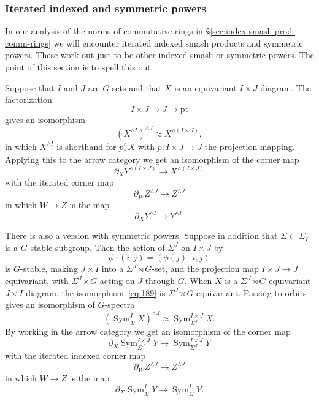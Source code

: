 \documentclass{amsart}
\theoremstyle{definition}
\theoremstyle{remark}
\DeclareMathOperator{\sym}{Sym}
\begin{document}
\subsubsection{Iterated indexed and symmetric powers}
\label{sec:iter-index-symm}

In our analysis of the norms of commutative rings in
\S\ref{sec:index-smash-prod-comm-rings} we will encounter iterated
indexed smash products and symmetric powers.  These work out just to
be other indexed smash or symmetric powers.  The point of this section
is to spell this out.

Suppose that $I$ and $J$ are $G$-sets and that $X$ is an equivariant
$I\times J$-diagram.   The factorization
\[
I\times J\to J\to \text{pt}
\]
gives an isomorphism 
\begin{equation}
\label{eq:189}
(X^{\wedge I})^{\wedge J} \approx X^{\wedge (I\times J)},
\end{equation}
in which $X^{\wedge I}$ is shorthand for $p^{\wedge}_{\ast}X$ with $p:I\times
J\to J$ the projection mapping.   Applying this to the arrow category
we get an isomorphism  of the corner map
\[
\partial_{X}Y^{\wedge (I\times J)} \to X^{\wedge(I\times J)}
\]
with the iterated corner map 
\[
\partial_{W}Z^{\wedge J} \to Z^{\wedge J}
\]
in which $W\to Z$ is the map 
\[
\partial_{X}Y^{\wedge I} \to Y^{\wedge I}.
\]

There is also a version with symmetric powers.  Suppose in addition
that $\Sigma\subset \Sigma_{I}$ is a $G$-stable subgroup.  Then the
action of $\Sigma^{J}$ on $I\times J$ by
\[
\phi\cdot (i,j) = (\phi(j)\cdot i,j)
\]
is $G$-stable, making $J\times I$ into a $\Sigma^{J}\rtimes G$-set,
and the projection map $I\times J\to J$ equivariant, with
$\Sigma^{J}\rtimes G$ acting on $J$ through $G$.  When $X$ is a
$\Sigma^{J}\rtimes G$-equivariant $J\times I$-diagram, the
isomorphism~\eqref{eq:189} is $\Sigma^{J}\rtimes G$-equivariant.
Passing to orbits gives an isomorphism of $G$-spectra 
\begin{equation}
\label{eq:191}
(\sym^{I}_{\Sigma}X)^{\wedge J} \approx
\sym^{I\times J}_{\Sigma^{J}}X.
\end{equation}
By working in the arrow category we get an isomorphism of the corner map 
\[
\partial_{X}\sym^{I\times J}_{\Sigma^{J}} Y \to \sym^{I\times J}_{\Sigma^{J}} Y
\]
with the iterated indexed corner map 
\begin{equation}
\label{eq:190}
\partial_{W}Z^{\wedge J} \to Z^{\wedge J}
\end{equation}
in which $W\to Z$ is the map 
\[
\partial_{X}\sym^{I}_{\Sigma}Y \to \sym^{I}_{\Sigma}Y.
\]
\end{document}

